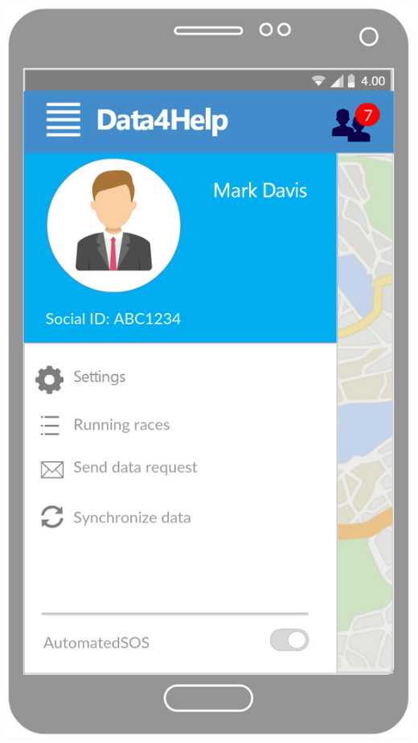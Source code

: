 \begin{center}
\begin{minipage}[c]{.40\textwidth}
\includegraphics[width=1\textwidth]{Images/userInterface/MainMenu}
\end{minipage}
\end{center}

